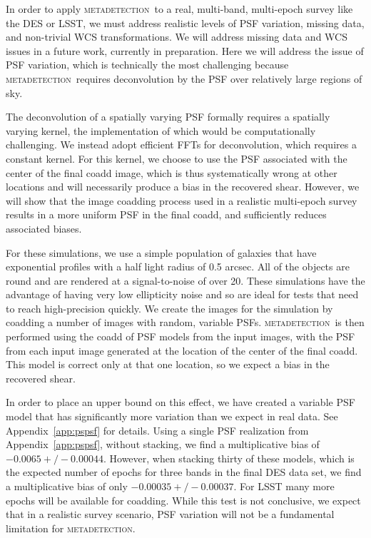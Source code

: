 \documentclass[fleqn,useAMS,usenatbib]{mnras}
\newcommand{\mdet}{\textsc{metadetection}}
\begin{document}
In order to apply \mdet\ to a real, multi-band, multi-epoch survey like the DES
or LSST, we must address realistic levels of PSF variation, missing data, and
non-trivial WCS transformations. We will address missing data and WCS issues in
a future work, currently in preparation. Here we will address the issue of PSF
variation, which is technically the most challenging because \mdet\ requires
deconvolution by the PSF over relatively large regions of sky.

The deconvolution of a spatially varying PSF formally requires a spatially
varying kernel, the implementation of which would be computationally
challenging.  We instead adopt efficient FFTs for deconvolution, which requires
a constant kernel.  For this kernel, we choose to use the PSF associated with
the center of the final coadd image, which is thus systematically wrong at
other locations and will necessarily produce a bias in the recovered shear.
However, we will show that the image coadding process used in a realistic
multi-epoch survey results in a more uniform PSF in the final coadd, and
sufficiently reduces associated biases.

For these simulations, we use a simple population of galaxies that have
exponential profiles with a half light radius of 0.5 arcsec. All of the
objects are round and are rendered at a signal-to-noise of over 20. These
simulations have the advantage of having very low ellipticity noise and so are
ideal for tests that need to reach high-precision quickly. We create the images
for the simulation by coadding a number of images with random, variable PSFs.
\mdet\ is then performed using the coadd of PSF models from the input images,
with the PSF from each input image generated at the location of the center of
the final coadd.  This model is correct only at that one location, so we expect
a bias in the recovered shear.

In order to place an upper bound on this effect, we have created a variable PSF
model that has significantly more variation than we expect in real data. See
Appendix~\ref{app:pspsf} for details.  Using a single PSF realization from
Appendix~\ref{app:pspsf}, without stacking, we find a multiplicative bias of
$-0.0065 +/- 0.00044$.  However, when stacking thirty of these models, which is
the expected number of epochs for three bands in the final DES data set, we
find a multiplicative bias of only $-0.00035 +/- 0.00037$.  For LSST many more
epochs will be available for coadding.   While this test is not conclusive, we
expect that in a realistic survey scenario, PSF variation will not be a
fundamental limitation for \mdet.
\end{document}
